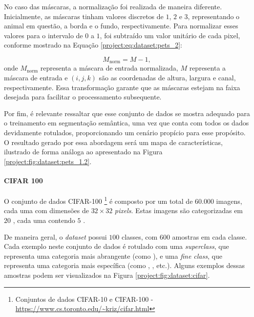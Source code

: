 No caso das máscaras, a normalização foi realizada de maneira diferente. Inicialmente, as máscaras tinham valores discretos de $1$, $2$ e $3$, representando o animal em questão, a borda e o fundo, respectivamente. Para normalizar esses valores para o intervalo de $0$ a $1$, foi subtraído um valor unitário de cada pixel, conforme mostrado na Equação \ref{project:eq:dataset:pets_2}:

\begin{equation}
    \label{project:eq:dataset:pets_2}
    M_{\text{norm}} = M - 1,
\end{equation}
onde $M_{\text{norm}}$ representa a máscara de entrada normalizada, $M$ representa a máscara de entrada e $(i,j,k)$ são as coordenadas de altura, largura e canal, respectivamente. Essa transformação garante que as máscaras estejam na faixa desejada para facilitar o processamento subsequente.

Por fim, é relevante ressaltar que esse conjunto de dados se mostra adequado para o treinamento em segmentação semântica, uma vez que conta com todos os dados devidamente rotulados, proporcionando um cenário propício para esse propósito. O resultado gerado por essa abordagem será um mapa de características, ilustrado de forma análoga ao apresentado na Figura \ref{project:fig:dataset:pets_1.2}.

\paragraph{CIFAR 100}
\label{project:dataset:cifar}
O conjunto de dados CIFAR-100 \footnote{Conjuntos de dados CIFAR-10 e CIFAR-100 - \url{https://www.cs.toronto.edu/~kriz/cifar.html}} \citep{Krizhevsky2014TheDataset} é composto por um total de $60.000$ imagens, cada uma com dimensões de $32 \times 32$ \textit{pixels}. Estas imagens são categorizadas em $20$ , cada uma contendo $5$ .

De maneira geral, o \textit{dataset} possui $100$ classes, com $600$ amostras em cada classe. Cada exemplo neste conjunto de dados é rotulado com uma \textit{superclass}, que representa uma categoria mais abrangente (como ), e uma \textit{fine class}, que representa uma categoria mais específica (como , , etc.). Alguns exemplos dessas amostras podem ser visualizados na Figura \ref{project:fig:dataset:cifar}.

